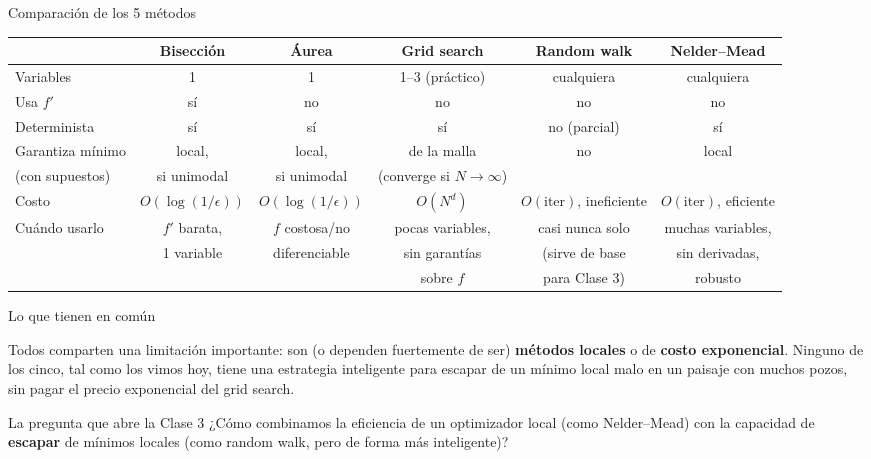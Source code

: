 \documentclass[aspectratio=169,10pt]{beamer}
\begin{document}
\begin{frame}{Comparación de los 5 métodos}
  \tiny
  \begin{center}
  \begin{tabular}{lccccc}
    \toprule
    & \textbf{Bisección} & \textbf{Áurea} & \textbf{Grid search} &
      \textbf{Random walk} & \textbf{Nelder--Mead} \\
    \midrule
    Variables & 1 & 1 & 1--3 (práctico) & cualquiera & cualquiera \\
    Usa $f'$ & sí & no & no & no & no \\
    Determinista & sí & sí & sí & no (parcial) & sí \\
    Garantiza mínimo & local, & local, & de la malla & no & local \\
    (con supuestos) & si unimodal & si unimodal & (converge si $N\to\infty$) & & \\
    Costo & $O(\log(1/\epsilon))$ & $O(\log(1/\epsilon))$ & $O(N^d)$ &
      $O(\text{iter})$, ineficiente & $O(\text{iter})$, eficiente \\
    Cuándo usarlo & $f'$ barata, & $f$ costosa/no & pocas variables, & casi
      nunca solo & muchas variables, \\
    & 1 variable & diferenciable & sin garantías & (sirve de base & sin
      derivadas, \\
    & & & sobre $f$ & para Clase 3) & robusto \\
    \bottomrule
  \end{tabular}
  \end{center}
\end{frame}

\begin{frame}{Lo que tienen en común}
  \begin{block}{}
    Todos comparten una limitación importante: son (o dependen
    fuertemente de ser) \textbf{métodos locales} o de \textbf{costo
    exponencial}. Ninguno de los cinco, tal como los vimos hoy, tiene una
    estrategia inteligente para escapar de un mínimo local malo en un
    paisaje con muchos pozos, sin pagar el precio exponencial del grid
    search.
  \end{block}
  \begin{exampleblock}{La pregunta que abre la Clase 3}
    ¿Cómo combinamos la eficiencia de un optimizador local (como
    Nelder--Mead) con la capacidad de \textbf{escapar} de mínimos locales
    (como random walk, pero de forma más inteligente)?
  \end{exampleblock}
\end{frame}
\end{document}
